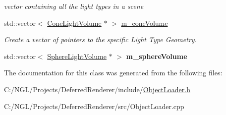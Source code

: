 \begin{DoxyCompactItemize}
\begin{DoxyCompactList}\small\item\em vector containing all the light types in a scene \end{DoxyCompactList}\item 
\hypertarget{class_object_loader_ab42fe978a30e5238cad996b32d309b4d}{std\-::vector$<$ \hyperlink{class_cone_light_volume}{Cone\-Light\-Volume} $\ast$ $>$ \hyperlink{class_object_loader_ab42fe978a30e5238cad996b32d309b4d}{m\-\_\-cone\-Volume}}\label{class_object_loader_ab42fe978a30e5238cad996b32d309b4d}

\begin{DoxyCompactList}\small\item\em Create a vector of pointers to the specific Light Type Geometry. \end{DoxyCompactList}\item 
\hypertarget{class_object_loader_a3f532bcb4d28d0725944928fef9fea3e}{std\-::vector$<$ \hyperlink{class_sphere_light_volume}{Sphere\-Light\-Volume} $\ast$ $>$ {\bfseries m\-\_\-sphere\-Volume}}\label{class_object_loader_a3f532bcb4d28d0725944928fef9fea3e}

\end{DoxyCompactItemize}


The documentation for this class was generated from the following files\-:\begin{DoxyCompactItemize}
\item 
C\-:/\-N\-G\-L/\-Projects/\-Deferred\-Renderer/include/\hyperlink{_object_loader_8h}{Object\-Loader.\-h}\item 
C\-:/\-N\-G\-L/\-Projects/\-Deferred\-Renderer/src/Object\-Loader.\-cpp\end{DoxyCompactItemize}
